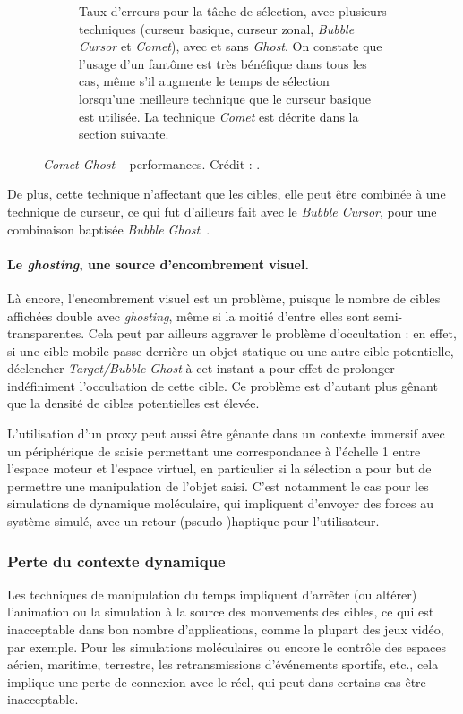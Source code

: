 \begin{figure}[!htb]
\begin{subfigure}[t]{0.49\textwidth}
			\caption{Taux d'erreurs pour la tâche de sélection, avec plusieurs techniques (curseur basique, curseur zonal, \emph{Bubble Cursor} et \emph{Comet}), avec et sans \emph{Ghost}. On constate que l'usage d'un fantôme est très bénéfique dans tous les cas, même s'il augmente le temps de sélection lorsqu'une meilleure technique que le curseur basique est utilisée. La technique \emph{Comet} est décrite dans la section suivante.}
			\label{fig:cometGhostErrors}
		\end{subfigure}
		\caption[\emph{Comet Ghost} -- temps de sélection et taux d'erreurs]{\emph{Comet Ghost} -- performances. Crédit : \cite{hasan2011comet}.}
		\label{fig:cometGhostTimeErrors}
	\end{figure}
		
	De plus, cette technique n'affectant que les cibles, elle peut être combinée à une technique de curseur, ce qui fut d'ailleurs fait avec le \emph{Bubble Cursor}, pour une combinaison baptisée \emph{Bubble Ghost}~\cite{hasan2011comet}.
	
	\paragraph{Le \emph{ghosting}, une source d'encombrement visuel.}
	Là encore, l'encombrement visuel est un problème, puisque le nombre de cibles affichées double avec \emph{ghosting}, même si la moitié d'entre elles sont semi-transparentes. Cela peut par ailleurs aggraver le problème d'occultation : en effet, si une cible mobile passe derrière un objet statique ou une autre cible potentielle, déclencher \emph{Target/Bubble Ghost} à cet instant a pour effet de prolonger indéfiniment l'occultation de cette cible. Ce problème est d'autant plus gênant que la densité de cibles potentielles est élevée.
		
	L'utilisation d'un proxy peut aussi être gênante dans un contexte immersif avec un périphérique de saisie permettant une correspondance à l'échelle 1 entre l'espace moteur et l'espace virtuel, en particulier si la sélection a pour but de permettre une manipulation de l'objet saisi. C'est notamment le cas pour les simulations de dynamique moléculaire, qui impliquent d'envoyer des forces au système simulé, avec un retour (pseudo-)haptique pour l'utilisateur.
		
	\subsubsection{Perte du contexte dynamique}
	Les techniques de manipulation du temps impliquent d'arrêter (ou altérer) l'animation ou la simulation à la source des mouvements des cibles, ce qui est inacceptable dans bon nombre d'applications, comme la plupart des jeux vidéo, par exemple. Pour les simulations moléculaires ou encore le contrôle des espaces aérien, maritime, terrestre, les retransmissions d'événements sportifs, etc., cela implique une perte de connexion avec le réel, qui peut dans certains cas être inacceptable.
	
